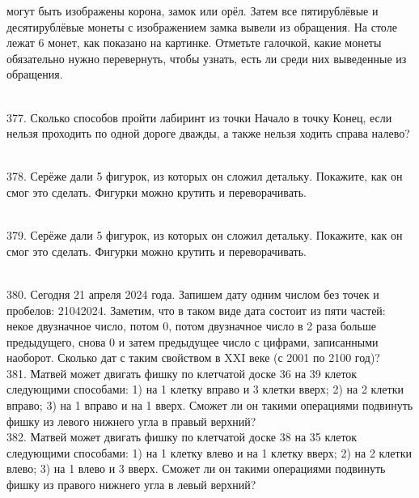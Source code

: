 могут быть изображены корона, замок или орёл. Затем все пятирублёвые и десятирублёвые монеты
с изображением замка вывели из обращения. На столе лежат 6 монет, как показано на картинке.
Отметьте галочкой, какие монеты обязательно нужно перевернуть, чтобы узнать, есть ли среди них
выведенные из обращения.\\
\begin{figure}[ht!]
\end{figure}\\
377. Сколько способов пройти лабиринт из точки Начало в точку Конец, если нельзя проходить по одной дороге
дважды, а также нельзя ходить справа налево?\\
\begin{figure}[ht!]
\end{figure}\\
378. Серёже дали 5 фигурок, из которых он сложил детальку. Покажите, как он смог это сделать.
Фигурки можно крутить и переворачивать.\\
\begin{figure}[ht!]
\end{figure}\\
379. Серёже дали 5 фигурок, из которых он сложил детальку. Покажите, как он смог это сделать.
Фигурки можно крутить и переворачивать.\\
\begin{figure}[ht!]
\end{figure}\\
380.  Сегодня 21 апреля 2024 года. Запишем дату одним числом без точек и пробелов: 21042024.
Заметим, что в таком виде дата состоит из пяти частей: некое двузначное число, потом 0, потом
двузначное число в 2 раза больше предыдущего, снова 0 и затем предыдущее число с цифрами,
записанными наоборот. Сколько дат с таким свойством в XXI веке (с 2001 по 2100 год)?\\
381. Матвей может двигать фишку по клетчатой доске 36 на 39 клеток следующими способами:
1) на 1 клетку вправо и 3 клетки вверх; 2) на 2 клетки вправо; 3) на 1 вправо и на 1 вверх.
Сможет ли он такими операциями подвинуть фишку из левого нижнего угла в правый верхний?\\
382.  Матвей может двигать фишку по клетчатой доске 38 на 35 клеток следующими способами:
1) на 1 клетку влево и на 1 клетку вверх; 2) на 2 клетки влево; 3) на 1 влево и 3 вверх.
Сможет ли он такими операциями подвинуть фишку из правого нижнего угла в левый верхний?\\
